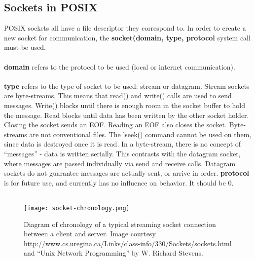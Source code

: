 \documentclass[11pt]{article}
\begin{document}
\subsection{Sockets in POSIX}
POSIX sockets all have a file descriptor they correspond to. In order to create a new socket for communication, the \textbf{socket(domain, type, protocol} system call must be used.\\ \\
\textbf{domain} refers to the protocol to be used (local or internet communication).\\ \\
\textbf{type} refers to the type of socket to be used: stream or datagram. Stream sockets are byte-streams. This means that read() and write() calls are used to send messages. Write() blocks until there is enough room in the socket buffer to hold the message. Read blocks until data has been written by the other socket holder. Closing the socket sends an EOF. Reading an EOF also closes the socket. Byte-streams are not conventional files. The lseek() command cannot be used on them, since data is destroyed once it is read. In a byte-stream, there is no concept of ``messages'' - data is written serially. This contrasts with the datagram socket, where messages are passed individually via send and receive calls. Datagram sockets do not guarantee messages are actually sent, or arrive in order. \textbf{protocol} is for future use, and currently has no influence on behavior. It should be 0.\\ \\

\begin{figure}[h!]
\centering
\texttt{[image: socket-chronology.png]}
\caption{Diagram of chronology of a typical streaming socket connection between a client and server. Image courtesy http://www.cs.uregina.ca/Links/class-info/330/Sockets/sockets.html and ``Unix Network Programming'' by W. Richard Stevens.}
\label{fig:socket-chronology}
\end{figure}
\end{document}
